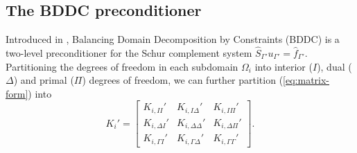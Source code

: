 \subsection{The BDDC preconditioner}
Introduced in \cite{dohrmann}, Balancing Domain Decomposition by Constraints (BDDC) is a two-level preconditioner for the Schur complement system $\widehat S_{\Gamma'}u_{\Gamma'} = \widehat f_{\Gamma'}$. Partitioning the degrees of freedom in each subdomain $\Omega_i$ into interior ($I$), dual ($\Delta$) and primal ($\Pi$) degrees of freedom, we can further partition (\ref{eq:matrix-form}) into
\[K_i' = \begin{bmatrix}
    K_{i,II}' & K_{i,I\Delta}' & K_{i,I\Pi}' \\
    K_{i,\Delta I}' & K_{i,\Delta \Delta}' & K_{i, \Delta \Pi}' \\
    K_{i,\Gamma I}' & K_{i, \Gamma\Delta}' & K_{i, \Gamma\Gamma}'
\end{bmatrix}.\]


